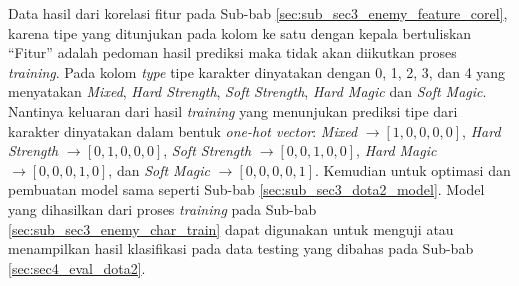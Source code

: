 Data hasil dari korelasi fitur pada Sub-bab \ref{sec:sub_sec3_enemy_feature_corel}, karena tipe yang ditunjukan pada kolom ke satu dengan kepala bertuliskan ``Fitur'' adalah pedoman hasil prediksi maka tidak akan diikutkan proses \textit{training}. Pada kolom \textit{type} tipe karakter dinyatakan dengan 0, 1, 2, 3, dan 4 yang menyatakan \textit{Mixed}, \textit{Hard Strength}, \textit{Soft Strength}, \textit{Hard Magic} dan \textit{Soft Magic}. Nantinya keluaran dari hasil \textit{training} yang menunjukan prediksi tipe dari karakter dinyatakan dalam bentuk \textit{one-hot vector}: \textit{Mixed} $\rightarrow [1, 0, 0, 0, 0]$, \textit{Hard Strength} $\rightarrow [0, 1, 0, 0, 0]$, \textit{Soft Strength} $\rightarrow [0, 0, 1, 0, 0]$, \textit{Hard Magic} $\rightarrow [0, 0, 0, 1, 0]$, dan \textit{Soft Magic} $\rightarrow [0, 0, 0, 0, 1]$. Kemudian untuk optimasi dan pembuatan model sama seperti Sub-bab \ref{sec:sub_sec3_dota2_model}. Model yang dihasilkan dari proses \textit{training} pada Sub-bab \ref{sec:sub_sec3_enemy_char_train} dapat digunakan untuk menguji atau menampilkan hasil klasifikasi pada data testing yang dibahas pada Sub-bab \ref{sec:sec4_eval_dota2}.
\vspace{1ex}